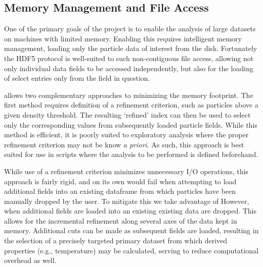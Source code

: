 \subsection{Memory Management and File Access}
\label{sec:fileIO}
One of the primary goals of the  project is to enable the analysis of large datasets on machines with limited memory.
Enabling this requires intelligent memory management, loading only the particle data of interest from the disk.
Fortunately the HDF5 protocol is well-suited to such non-contiguous file access, allowing not only individual data fields to be accessed independently, but also for the loading of select entries only from the field in question.

 allows two complementary approaches to minimizing the memory footprint.
The first method requires definition of a refinement criterion, such as particles above a given density threshold.
The resulting `refined' index can then be used to select only the corresponding values from subsequently loaded particle fields.
While this method is efficient, it is poorly suited to exploratory analysis where the proper refinement criterion may not be know {\it{a priori}}.  As such, this approach is best suited for use in scripts where the analysis to be performed is defined beforehand.

While use of a refinement criterion minimizes unnecessary I/O operations, this approach is fairly rigid, and on its own would fail when attempting to load additional fields into an existing  dataframe from which particles have been manually dropped by the user.
To mitigate this we take advantage of 
However, when additional fields are loaded into an existing  existing data are dropped.
This allows for the incremental refinement along several axes of the data kept in memory.
Additional cuts can be made as subsequent fields are loaded, resulting in the selection of a precisely targeted primary dataset from which derived properties (e.g., temperature) may be calculated, serving to reduce computational overhead as well.
